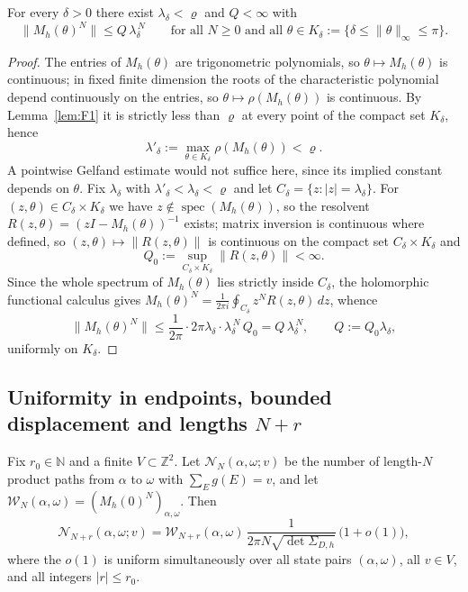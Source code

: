 \begin{lemma}
\label{lem:F2}
For every \(\delta>0\) there exist \(\lambda_\delta<\varrho\) and
\(Q<\infty\) with
\[
\|M_h(\theta)^N\|\le Q\,\lambda_\delta^{\,N}
\qquad\text{for all }N\ge0\text{ and all }\theta\in K_\delta
:=\{\delta\le\|\theta\|_\infty\le\pi\}.
\]
\end{lemma}

\begin{proof}
The entries of \(M_h(\theta)\) are trigonometric polynomials, so
\(\theta\mapsto M_h(\theta)\) is continuous; in fixed finite dimension the
roots of the characteristic polynomial depend continuously on the entries, so
\(\theta\mapsto\rho(M_h(\theta))\) is continuous. By Lemma~\ref{lem:F1} it is
strictly less than \(\varrho\) at every point of the compact set
\(K_\delta\), hence
\[
\lambda'_\delta:=\max_{\theta\in K_\delta}\rho(M_h(\theta))<\varrho .
\]
A pointwise Gelfand estimate would not suffice here, since its implied
constant depends on \(\theta\). Fix \(\lambda_\delta\) with
\(\lambda'_\delta<\lambda_\delta<\varrho\) and let
\(C_\delta=\{z:|z|=\lambda_\delta\}\). For
\((z,\theta)\in C_\delta\times K_\delta\) we have
\(z\notin\operatorname{spec}(M_h(\theta))\), so the resolvent
\(R(z,\theta)=(zI-M_h(\theta))^{-1}\) exists; matrix inversion is continuous
where defined, so \((z,\theta)\mapsto\|R(z,\theta)\|\) is continuous on the
compact set \(C_\delta\times K_\delta\) and
\[
Q_0:=\sup_{C_\delta\times K_\delta}\|R(z,\theta)\|<\infty .
\]
Since the whole spectrum of \(M_h(\theta)\) lies strictly inside
\(C_\delta\), the holomorphic functional calculus gives
\(M_h(\theta)^N=\frac{1}{2\pi i}\oint_{C_\delta}z^NR(z,\theta)\,dz\), whence
\[
\|M_h(\theta)^N\|\le\frac{1}{2\pi}\cdot2\pi\lambda_\delta\cdot
\lambda_\delta^{\,N}\,Q_0=Q\,\lambda_\delta^{\,N},
\qquad Q:=Q_0\lambda_\delta,
\]
uniformly on \(K_\delta\).
\end{proof}

\subsection{Uniformity in endpoints, bounded displacement and lengths \texorpdfstring{\(N+r\)}{N+r}}

\begin{proposition}
\label{prop:F3}
Fix \(r_0\in\mathbb N\) and a finite \(V\subset\mathbb Z^2\). Let
\(\mathcal N_N(\alpha,\omega;v)\) be the number of length-\(N\) product paths
from \(\alpha\) to \(\omega\) with \(\sum_E g(E)=v\), and let
\(\mathcal W_N(\alpha,\omega)=(M_h(0)^N)_{\alpha,\omega}\). Then
\[
\mathcal N_{N+r}(\alpha,\omega;v)
=\mathcal W_{N+r}(\alpha,\omega)\,
\frac{1}{2\pi N\sqrt{\det\Sigma_{D,h}}}\,\bigl(1+o(1)\bigr),
\]
where the \(o(1)\) is uniform simultaneously over all state pairs
\((\alpha,\omega)\), all \(v\in V\), and all integers \(|r|\le r_0\).
\end{proposition}

